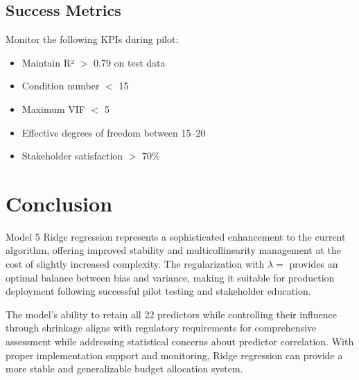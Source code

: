 \subsection{Success Metrics}

Monitor the following KPIs during pilot:
\begin{itemize}
    \item Maintain R² $>$ 0.79 on test data
    \item Condition number $<$ 15
    \item Maximum VIF $<$ 5
    \item Effective degrees of freedom between 15--20
    \item Stakeholder satisfaction $>$ 70\%
\end{itemize}

\section{Conclusion}

Model 5 Ridge regression represents a sophisticated enhancement to the current algorithm, offering improved stability and multicollinearity management at the cost of slightly increased complexity. The \ModelFiveRegularizationStrength{} regularization with $\lambda = $ \ModelFiveAlpha{} provides an optimal balance between bias and variance, making it suitable for production deployment following successful pilot testing and stakeholder education.

The model's ability to retain all 22 predictors while controlling their influence through shrinkage aligns with regulatory requirements for comprehensive assessment while addressing statistical concerns about predictor correlation. With proper implementation support and monitoring, Ridge regression can provide a more stable and generalizable budget allocation system.